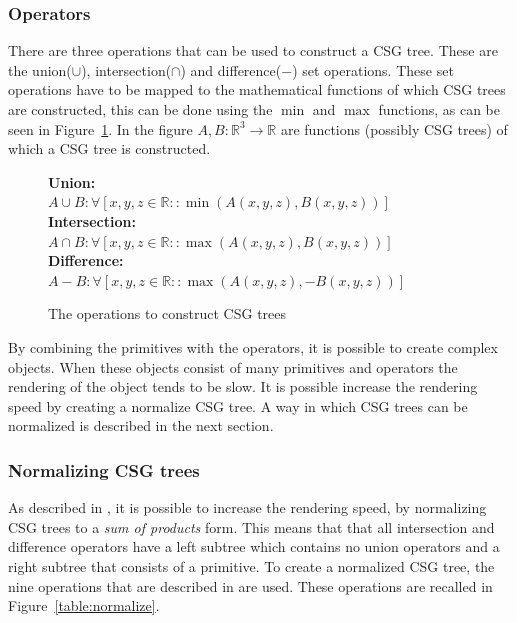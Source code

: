 \documentclass[a4paper,10pt,twocolumn]{article}
\begin{document}
\subsubsection{Operators}
    There are three operations that can be used to construct a CSG tree. These are the union($\cup$), intersection($\cap$) and difference($-$) set operations. These set operations have to be mapped to the mathematical functions of which CSG trees are constructed, this can be done using the $\min$ and $\max$ functions, as can be seen in Figure~\ref{figure:operations}. In the figure $A, B:\mathbb{R}^3 \rightarrow \mathbb{R}$ are functions (possibly CSG trees) of which a CSG tree is constructed.

    \begin{figure}[h]
        {\fontsize{8.7}{10}\selectfont
        \textbf{Union:}\\
        $A \cup B: \forall[x,y,z \in \mathbb{R} :: \min(A(x, y, z), B(x, y, z))]$ \\

        \textbf{Intersection:}\\
        $A \cap B: \forall[x,y,z \in \mathbb{R} :: \max(A(x, y, z), B(x, y, z))]$ \\

        \textbf{Difference:}\\
        $A - B: \forall[x,y,z \in \mathbb{R} :: \max(A(x, y, z), -B(x, y, z))]$
        }
        \caption{The operations to construct CSG trees}
        \label{figure:operations}
    \end{figure}

    By combining the primitives with the operators, it is possible to create complex objects. When these objects consist of many primitives and operators the rendering of the object tends to be slow. It is possible increase the rendering speed by creating a normalize CSG tree. A way in which CSG trees can be normalized is described in the next section.

\subsubsection{Normalizing CSG trees}
    As described in \cite{Wiegand96}, it is possible to increase the rendering speed, by normalizing CSG trees to a \textit{sum of products} form. This means that that all intersection and difference operators have a left subtree which contains no union operators and a right subtree that consists of a primitive. To create a normalized CSG tree, the nine operations that are described in \cite{Wiegand96} are used. These operations are recalled in Figure~\ref{table:normalize}.
\end{document}
